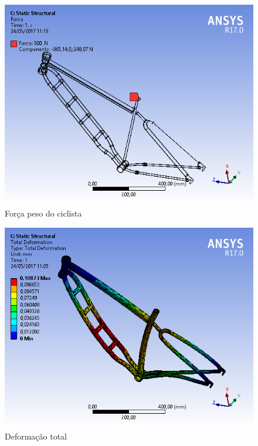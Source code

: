 	\graphicspath{{figuras/}}
	\begin{figure}[h!]
		\centering
		\includegraphics[scale=0.60]{inter_F900.png}
		\caption{Força peso do ciclista}
		\label{img:inter_F900}
	\end{figure}
	
	\graphicspath{{figuras/}}
	\begin{figure}[h!]
		\centering
		\includegraphics[scale=0.60]{inter_deformacao_total.png}
		\caption{Deformação total}
		\label{img:inter_deformacao_total}
	\end{figure}
	
